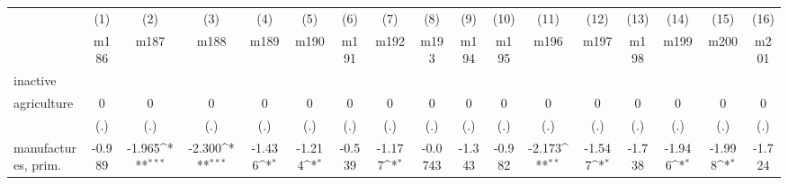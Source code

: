 {
\def\sym#1{\ifmmode^{#1}\else\(^{#1}\)\fi}
\begin{tabular}{l*{16}{c}}
\hline\hline
                    &\multicolumn{1}{c}{(1)}&\multicolumn{1}{c}{(2)}&\multicolumn{1}{c}{(3)}&\multicolumn{1}{c}{(4)}&\multicolumn{1}{c}{(5)}&\multicolumn{1}{c}{(6)}&\multicolumn{1}{c}{(7)}&\multicolumn{1}{c}{(8)}&\multicolumn{1}{c}{(9)}&\multicolumn{1}{c}{(10)}&\multicolumn{1}{c}{(11)}&\multicolumn{1}{c}{(12)}&\multicolumn{1}{c}{(13)}&\multicolumn{1}{c}{(14)}&\multicolumn{1}{c}{(15)}&\multicolumn{1}{c}{(16)}\\
                    &\multicolumn{1}{c}{m186}&\multicolumn{1}{c}{m187}&\multicolumn{1}{c}{m188}&\multicolumn{1}{c}{m189}&\multicolumn{1}{c}{m190}&\multicolumn{1}{c}{m191}&\multicolumn{1}{c}{m192}&\multicolumn{1}{c}{m193}&\multicolumn{1}{c}{m194}&\multicolumn{1}{c}{m195}&\multicolumn{1}{c}{m196}&\multicolumn{1}{c}{m197}&\multicolumn{1}{c}{m198}&\multicolumn{1}{c}{m199}&\multicolumn{1}{c}{m200}&\multicolumn{1}{c}{m201}\\
\hline
inactive            &                     &                     &                     &                     &                     &                     &                     &                     &                     &                     &                     &                     &                     &                     &                     &                     \\
agriculture         &           0         &           0         &           0         &           0         &           0         &           0         &           0         &           0         &           0         &           0         &           0         &           0         &           0         &           0         &           0         &           0         \\
                    &         (.)         &         (.)         &         (.)         &         (.)         &         (.)         &         (.)         &         (.)         &         (.)         &         (.)         &         (.)         &         (.)         &         (.)         &         (.)         &         (.)         &         (.)         &         (.)         \\
[1em]
manufactures, prim. &      -0.989         &      -1.965\sym{***}&      -2.300\sym{***}&      -1.436\sym{*}  &      -1.214\sym{*}  &      -0.539         &      -1.177\sym{*}  &     -0.0743         &      -1.343         &      -0.982         &      -2.173\sym{**} &      -1.547\sym{*}  &      -1.738         &      -1.946\sym{*}  &      -1.998\sym{*}  &      -1.724         \\

\end{tabular}}
